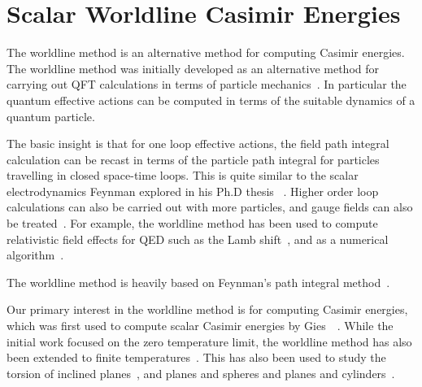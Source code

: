 

\section{Scalar Worldline Casimir Energies}

The worldline method is an alternative method for computing Casimir energies.
  The worldline method was initially developed as an alternative method for 
carrying out QFT calculations in terms of particle 
mechanics~\cite{McKeon1993, Strassler1992,Schubert2001}.
  In particular the quantum effective actions can be computed in terms of
 the suitable dynamics of a quantum particle.

The basic insight is that for one loop effective actions, 
the field path integral calculation can be recast in terms of the particle path
 integral for particles travelling in closed space-time loops.
  This is quite similar to the scalar electrodynamics Feynman explored
 in his Ph.D thesis~\cite{Feynman1942, Brown2005}
.
  Higher order loop calculations can also be carried out with more particles, 
and gauge fields can also be treated~\cite{Schubert2001}.
  For example, the worldline method has been used to compute relativistic
 field effects for QED such as the Lamb shift~\cite{Schmidt1995}, and as a numerical algorithm~\cite{Mazur2014}.

The worldline method is heavily based on Feynman's path integral method~\cite{Feynman1948,Feynman1965}.

Our primary interest in the worldline method is for computing Casimir energies, 
which was first used to compute scalar Casimir energies by Gies~\etal~\cite{Gies2003,Gies2006, Gies2006a}.
 While the initial work focused on the zero temperature limit, 
the worldline method has also been extended to finite temperatures~\cite{Klingmueller2008}.
  This has also been used to study the torsion of inclined planes~\cite{Weber2009},
 and planes and spheres and planes and cylinders~\cite{Weber2010, Weber2010a}.  

